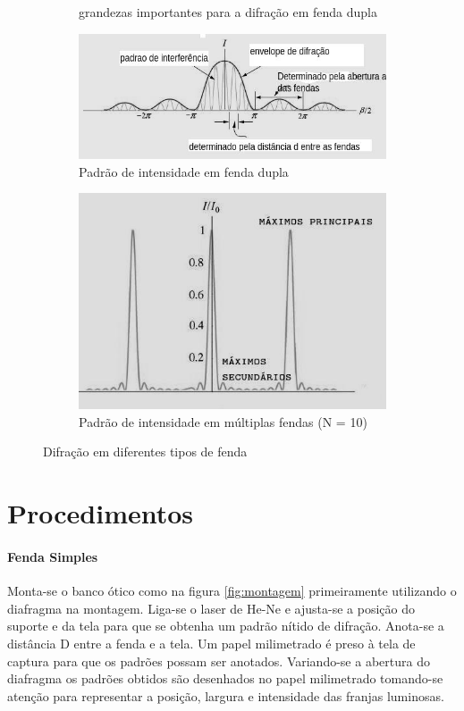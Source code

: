 \documentclass[a4paper,11pt]{article}
\begin{document}
\begin{figure}[H]
\begin{subfigure}[!htp]{0.5\textwidth}
		\caption{grandezas importantes para a difração em fenda dupla}
		\label{fig:double-slit-schematic}
	\end{subfigure}
%
\vspace{1 cm}
%
\hspace{-1 cm}	
	\begin{subfigure}[!htp]{0.5\textwidth}
		\includegraphics[width = 8 cm]{./images/MIT-figure.jpg}
		\caption{Padrão de intensidade em fenda dupla}
		\label{fig:double-slit-patter}
	\end{subfigure}
\hspace{2 cm}	
	\begin{subfigure}[!htp]{0.5\textwidth}
		\includegraphics[width = 6 cm]{./images/MIT-mult-slit.jpg}
		\caption{Padrão de intensidade em múltiplas fendas (N = 10)}
		\label{fig:mult-slit-pattern}
	\end{subfigure}

	\caption{Difração em diferentes tipos de fenda}

\end{figure}

\FloatBarrier
\section{Procedimentos}

\paragraph{Fenda Simples}Monta-se o banco ótico como na
figura \ref{fig:montagem}
primeiramente utilizando o diafragma na montagem. 
Liga-se o laser de He-Ne e ajusta-se a posição do suporte e da tela para
que se obtenha um padrão nítido de difração. Anota-se a distância D entre 
a fenda e a tela. Um papel milimetrado é preso à tela de captura para que
os padrões possam ser anotados. Variando-se a abertura do diafragma os padrões
obtidos são desenhados no papel milimetrado tomando-se atenção para representar
a posição, largura e intensidade das franjas luminosas. 
\end{document}
